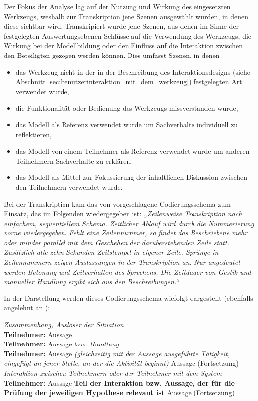Der Fokus der Analyse lag auf der Nutzung und Wirkung des eingesetzten Werkzeugs, weshalb zur Transkription jene Szenen ausgewählt wurden, in denen diese sichtbar wird. Transkripiert wurde jene Szenen, aus denen im Sinne der festgelegten Auswertungsebenen Schlüsse auf die Verwendung des Werkzeugs, die Wirkung bei der Modellbildung oder den Einfluss auf die Interaktion zwischen den Beteiligten gezogen werden können. Dies umfasst Szenen, in denen
\begin{itemize}
  \item das Werkzeug nicht in der in der Beschreibung des Interaktionsdesigns (siehe Abschnitt \ref{sec:benutzerinteraktion_mit_dem_werkzeug}) festgelegten Art verwendet wurde,
  \item die Funktionalität oder Bedienung des Werkzeugs missverstanden wurde,
  \item das Modell als Referenz verwendet wurde um Sachverhalte individuell zu reflektieren,
  \item das Modell von einem Teilnehmer als Referenz verwendet wurde um anderen Teilnehmern Sachverhalte zu erklären,
  \item das Modell als Mittel zur Fokussierung der inhaltlichen Diskussion zwischen den Teilnehmern verwendet wurde.
\end{itemize}

Bei der Transkription kam das von \citet{Hornecker04} vorgeschlagene Codierungsschema zum Einsatz, das im Folgenden wiedergegeben ist: \emph{„Zeilenweise Transkription nach einfachem, sequentiellem Schema. Zeitlicher Ablauf wird durch die Nummerierung vorne wiedergegeben. Fehlt eine Zeilennummer, so findet das Beschriebene mehr oder minder parallel mit dem Geschehen der darüberstehenden Zeile statt. Zusätzlich alle zehn Sekunden Zeitstempel in eigener Zeile. Sprünge in Zeilennummern zeigen Auslassungen in der Transkription an. Nur angedeutet werden Betonung und Zeitverhalten des Sprechens. Die Zeitdauer von Gestik und manueller Handlung ergibt sich aus den Beschreibungen.“} 

In der Darstellung werden dieses Codierungsschema wiefolgt dargestellt (ebenfalls angelehnt an \citet{Hornecker04}):
\begin{transkript}
	\emph{Zusammenhang, Auslöser der Situation}\\
	\textbf{Teilnehmer:} Aussage\\
	\textbf{Teilnehmer:} Aussage \emph{bzw. Handlung}\\	
	\textbf{Teilnehmer:} Aussage \emph{(gleichzeitig mit der Aussage ausgeführte Tätigkeit, eingefügt an jener Stelle, an der die Aktivität beginnt)} Aussage (Fortsetzung)\\
	\emph{Interaktion zwischen Teilnehmern oder der Teilnehmer mit dem System}\\
	\textbf{Teilnehmer:} Aussage \textbf{Teil der Interaktion bzw. Aussage, der für die Prüfung der jeweiligen Hypothese relevant ist} Aussage (Fortsetzung)\\
\end{transkript}



